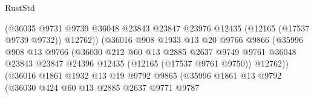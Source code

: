 \begin{lexlean}{RustStd}
\begin{coremodule}
                                      (@36035
                                        @9731
                                        @9739
                                        @36048
                                        @23843
                                        @23847
                                        @23976
                                        @12435
                                        (@12165 (@17537 @9739 @9732))
                                        @12762))
                                    (@36016
                                      @908
                                      @1933
                                      @13
                                      @20
                                      @9766
                                      @9866
                                      (@35996
                                        @908
                                        @13
                                        @9766
                                        (@36030
                                          @212
                                          @60
                                          @13
                                          @2885
                                          @2637
                                          @9749
                                          @9761
                                          @36048
                                          @23843
                                          @23847
                                          @24396
                                          @12435
                                          (@12165 (@17537 @9761 @9750))
                                          @12762))
                                      (@36016
                                        @1861
                                        @1932
                                        @13
                                        @19
                                        @9792
                                        @9865
                                        (@35996
                                          @1861
                                          @13
                                          @9792
                                          (@36030
                                            @424
                                            @60
                                            @13
                                            @2885
                                            @2637
                                            @9771
                                            @9787

\end{coremodule}
\end{lexlean}
